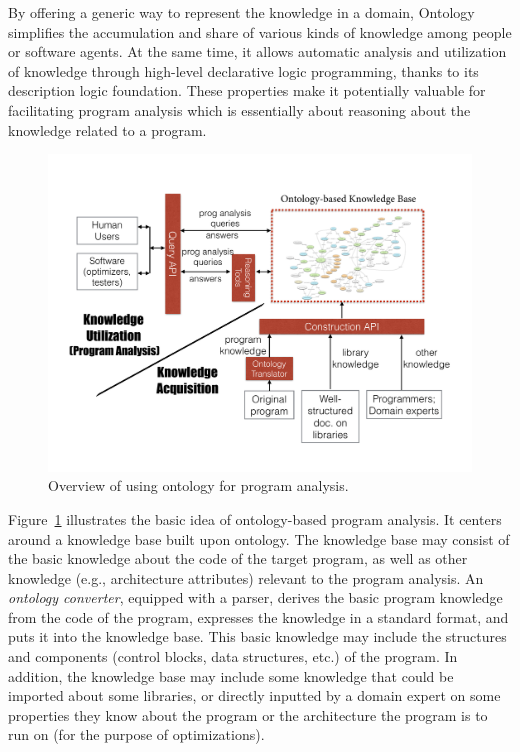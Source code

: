 By offering a generic way to represent the knowledge in a domain,
Ontology simplifies the accumulation and share of various kinds of
knowledge among people or software agents. At the same time, it allows
automatic analysis and utilization of knowledge through high-level
declarative logic programming, thanks to its description logic
foundation.  These properties make it potentially valuable for
facilitating program analysis which is essentially about reasoning
about the knowledge related to a program. 



\begin{figure}[t]
\centering
\includegraphics[width=.9\textwidth]{graph/overview.pdf}
\caption{Overview of using ontology for program
  analysis.}\label{fig:overview}
\end{figure}

Figure~\ref{fig:overview} illustrates the basic idea of ontology-based
program analysis. It centers around a knowledge base built upon
ontology.  The knowledge base may consist of the basic knowledge about
the code of the target program, as well as other knowledge (e.g.,
architecture attributes) relevant to the program analysis. An {\em
  ontology converter}, equipped with a parser, derives the basic
program knowledge from the code of the program, expresses the
knowledge in a standard format, and puts it into the knowledge
base. This basic knowledge may include the structures and components
(control blocks, data structures, etc.) of the program. In addition,
the knowledge base may include some knowledge that could be imported
about some libraries, or directly inputted by a domain expert on some
properties they know about the program or the architecture the program
is to run on (for the purpose of optimizations).

